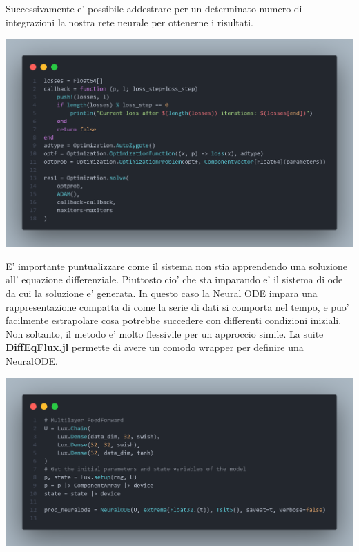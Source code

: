 Successivamente e' possibile addestrare per un determinato numero di integrazioni 
la nostra rete neurale per ottenerne i risultati. 

\begin{minipage}{\linewidth}
    \centering
    \includegraphics[width=\textwidth]{img/fanntrain.png}
    \label{fig:NN_train_Julia_example}
\end{minipage}

E' importante puntualizzare come il sistema non stia apprendendo una soluzione all'
equazione differenziale. Piuttosto cio' che sta imparando e' il sistema di ode da cui 
la soluzione e' generata. In questo caso la Neural ODE impara una rappresentazione 
compatta di come la serie di dati si comporta nel tempo, e puo' facilmente estrapolare
cosa potrebbe succedere con differenti condizioni iniziali. Non soltanto, il metodo e' 
molto flessivile per un approccio simile. La suite \textbf{DiffEqFlux.jl} \cite{chen2019neural} permette di avere un comodo wrapper 
per definire una NeuralODE.

\begin{minipage}{\linewidth}
    \centering
    \includegraphics[width=\textwidth]{img/fneuralode.png}
    \label{fig:NeuralODE_Julia_example}
\end{minipage}

